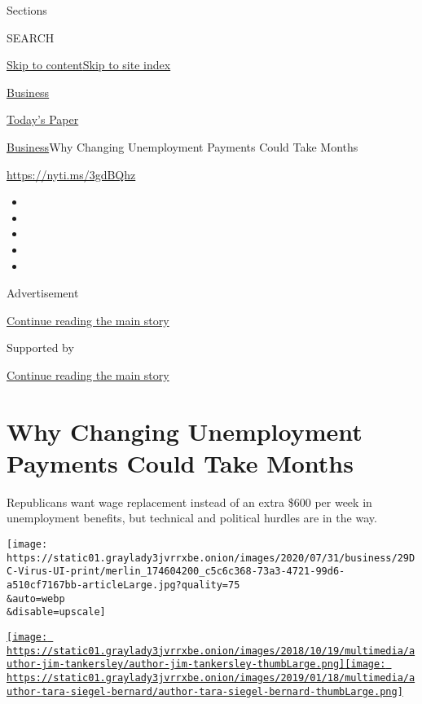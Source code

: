 Sections

SEARCH

\protect\hyperlink{site-content}{Skip to
content}\protect\hyperlink{site-index}{Skip to site index}

\href{https://www.nytimes3xbfgragh.onion/section/business}{Business}

\href{https://myaccount.nytimes3xbfgragh.onion/auth/login?response_type=cookie\&client_id=vi}{}

\href{https://www.nytimes3xbfgragh.onion/section/todayspaper}{Today's
Paper}

\href{/section/business}{Business}\textbar{}Why Changing Unemployment
Payments Could Take Months

\url{https://nyti.ms/3gdBQhz}

\begin{itemize}
\item
\item
\item
\item
\item
\end{itemize}

Advertisement

\protect\hyperlink{after-top}{Continue reading the main story}

Supported by

\protect\hyperlink{after-sponsor}{Continue reading the main story}

\hypertarget{why-changing-unemployment-payments-could-take-months}{%
\section{Why Changing Unemployment Payments Could Take
Months}\label{why-changing-unemployment-payments-could-take-months}}

Republicans want wage replacement instead of an extra \$600 per week in
unemployment benefits, but technical and political hurdles are in the
way.

\texttt{[image: https://static01.graylady3jvrrxbe.onion/images/2020/07/31/business/29DC-Virus-UI-print/merlin\_174604200\_c5c6c368-73a3-4721-99d6-a510cf7167bb-articleLarge.jpg?quality=75\\\&auto=webp\\\&disable=upscale]}

\href{https://www.nytimes3xbfgragh.onion/by/jim-tankersley}{\texttt{[image: https://static01.graylady3jvrrxbe.onion/images/2018/10/19/multimedia/author-jim-tankersley/author-jim-tankersley-thumbLarge.png]}}\href{https://www.nytimes3xbfgragh.onion/by/tara-siegel-bernard}{\texttt{[image: https://static01.graylady3jvrrxbe.onion/images/2019/01/18/multimedia/author-tara-siegel-bernard/author-tara-siegel-bernard-thumbLarge.png]}}

